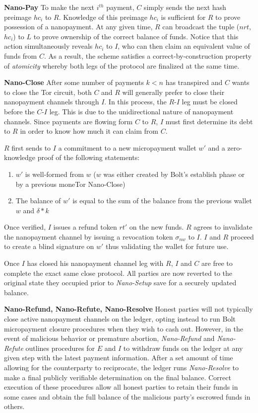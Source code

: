 \textbf{Nano-Pay} To make the next $i^{th}$ payment, $C$ simply sends the next
hash preimage $hc_i$ to $R$. Knowledge of this preimage $hc_i$ is sufficient for
$R$ to prove possession of a nanopayment. At any given time, $R$ can broadcast
the tuple ($nrt$, $hc_i$) to $L$ to prove ownership of the correct balance of
funds. Notice that this action simultaneously reveals $hc_i$ to $I$, who can
then claim an equivalent value of funds from $C$. As a result, the
scheme satisfies a correct-by-construction property of \emph{atomicity}
whereby both legs of the protocol are finalized at the same time.

\textbf{Nano-Close} After some number of payments $k < n$ has transpired and $C$
wants to close the Tor circuit, both $C$ and $R$ will generally prefer to close
their nanopayment channels through $I$. In this process, the $R$-$I$ leg must be
closed before the $C$-$I$ leg. This is due to the unidirectional nature of
nanopayment channels. Since payments are flowing form $C$ to $R$, $I$ must first
determine its debt to $R$ in order to know how much it can claim from $C$.

$R$ first sends to $I$ a commitment to a new micropayment wallet $w'$ and a
zero-knowledge proof of the following statements:

\begin{enumerate}
\item $w'$ is well-formed from $w$ ($w$ was either created by Bolt's establish phase or by a previous moneTor Nano-Close)
\item The balance of $w'$ is equal to the sum of the balance from the previous
  wallet $w$ and $\delta * k$
\end{enumerate}

Once verified, $I$ issues a refund token $rt'$ on the new funds. $R$ agrees to
invalidate the nanopayment channel by issuing a revocation token $\sigma_{nw}$
to $I$. $I$ and $R$ proceed to create a blind signature on $w'$ thus validating
the wallet for future use.

Once $I$ has closed his nanopayment channel leg with $R$, $I$ and $C$ are free
to complete the exact same close protocol. All parties are now reverted to the
original state they occupied prior to \emph{Nano-Setup} save for a securely updated
balance.

\textbf{Nano-Refund, Nano-Refute, Nano-Resolve} Honest parties will not typically
close active nanopayment channels on the ledger, opting instead to run Bolt
micropayment closure procedures when they wish to cash out. However, in the
event of malicious behavior or premature abortion, \emph{Nano-Refund} and
\emph{Nano-Refute} outlines procedures for $E$ and $I$ to withdraw funds on the
ledger at any given step with the latest payment information. After a set amount
of time allowing for the counterparty to reciprocate, the ledger runs
\emph{Nano-Resolve} to make a final publicly verifiable determination on the final
balance. Correct execution of these procedures allow all honest parties to
retain their funds in some cases and obtain the full balance of the malicious
party's escrowed funds in others.

